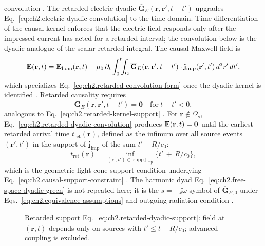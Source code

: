 convolution \cite{stratton1941}.
The retarded electric dyadic \(\overline{\mathbf{G}}_{E}(\mathbf{r},\mathbf{r}',t-t')\)
upgrades Eq.~\eqref{eq:ch2.electric-dyadic-convolution} to the time domain.
Time differentiation of the causal kernel enforces that the electric field responds only
after the impressed current has acted for a retarded interval; the convolution below is
the dyadic analogue of the scalar retarded integral.
The causal Maxwell field is
\begin{equation}
\label{eq:ch2.retarded-dyadic-convolution}
\mathbf{E}(\mathbf{r},t)
=
\mathbf{E}_{\mathrm{hom}}(\mathbf{r},t)
-\mu_0\,\partial_t\int_{0}^{t}\!\!\int_{\Omega}
\overline{\mathbf{G}}_{E}(\mathbf{r},\mathbf{r}',t-t')\cdot
\mathbf{j}_{\mathrm{imp}}(\mathbf{r}',t')\,d^{3}r'\,dt',
\end{equation}
which specializes Eq.~\eqref{eq:ch2.retarded-convolution-form} once the dyadic kernel
is identified \cite{stratton1941}. Retarded causality requires
\begin{equation}
\label{eq:ch2.retarded-dyadic-support}
\overline{\mathbf{G}}_{E}(\mathbf{r},\mathbf{r}',t-t')
=
\mathbf{0}\quad\text{for}\ t-t'<0,
\end{equation}
analogous to Eq.~\eqref{eq:ch2.retarded-kernel-support} \cite{stratton1941}. For
\(\mathbf{r}\notin\Omega_s\), Eq.~\eqref{eq:ch2.retarded-dyadic-convolution} produces
\(\mathbf{E}(\mathbf{r},t)=\mathbf{0}\) until the earliest retarded arrival time
\(t_{\mathrm{ret}}(\mathbf{r})\), defined as the infimum over all source events
\((\mathbf{r}',t')\) in the support of \(\mathbf{j}_{\mathrm{imp}}\) of the sum
\(t'+R/c_0\):
\begin{equation}
\label{eq:ch2.light-cone-arrival-time}
t_{\mathrm{ret}}(\mathbf{r})
=
\inf_{(\mathbf{r}',t')\in\operatorname{supp}\mathbf{j}_{\mathrm{imp}}}
\big\{t'\,+\,R/c_0\big\},
\end{equation}
which is the geometric light-cone support condition underlying
Eq.~\eqref{eq:ch2.causal-support-constraint} \cite{jackson1999}. The
harmonic dyad Eq.~\eqref{eq:ch2.free-space-dyadic-green} is not repeated here; it is
the \(s=-\jj\omega\) symbol of \(\overline{\mathbf{G}}_{E,0}\) under
Eqs.~\eqref{eq:ch2.equivalence-assumptions} and outgoing radiation condition
\cite{harrington2001}.
\begin{figure}[t]
\centering
{}
\caption{Retarded support Eq.~\eqref{eq:ch2.retarded-dyadic-support}: field at
\((\mathbf{r},t)\) depends only on sources with \(t'\le t-R/c_0\); advanced
coupling is excluded.}
\label{fig:ch2.retarded-light-cone}
\end{figure}
